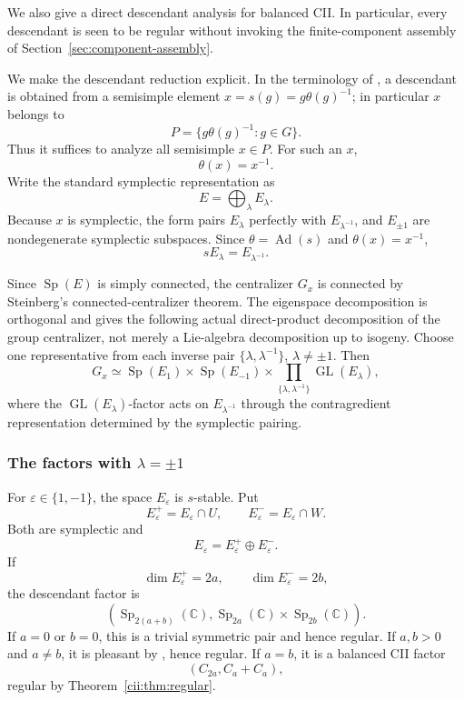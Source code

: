 \documentclass[11pt,reqno]{amsart}
\numberwithin{equation}{section}
\theoremstyle{definition}
\theoremstyle{remark}
\newcommand{\C}{\mathbb C}
\newcommand{\GL}{\operatorname{GL}}
\newcommand{\Sp}{\operatorname{Sp}}
\newcommand{\Ad}{\operatorname{Ad}}
\begin{document}
We also give a direct descendant analysis for balanced CII.  In particular,
every descendant is seen to be regular without invoking the finite-component
assembly of Section~\ref{sec:component-assembly}.

We make the descendant reduction explicit.  In the terminology of
\cite[Definition~7.2.2]{AG09}, a descendant is obtained from a semisimple
element \(x=s(g)=g\theta(g)^{-1}\); in particular \(x\) belongs to
\[
  P=\{g\theta(g)^{-1}:g\in G\}.
\]
Thus it suffices to analyze all semisimple \(x\in P\).  For such an
\(x\),
\[
\theta(x)=x^{-1}.
\]
Write the standard symplectic representation as
\[
E=\bigoplus_\lambda E_\lambda.
\]
Because \(x\) is symplectic, the form pairs
\(E_\lambda\) perfectly with \(E_{\lambda^{-1}}\), and
\(E_{\pm1}\) are nondegenerate symplectic subspaces.  Since
\(\theta=\Ad(s)\) and \(\theta(x)=x^{-1}\),
\[
sE_\lambda=E_{\lambda^{-1}}.
\]

Since $\Sp(E)$ is simply connected, the centralizer $G_x$ is connected by
Steinberg's connected-centralizer theorem.  The eigenspace decomposition is
orthogonal and gives the following actual direct-product decomposition of the
group centralizer, not merely a Lie-algebra decomposition up to isogeny.
Choose one representative from each inverse pair
\(\{\lambda,\lambda^{-1}\}\), \(\lambda\neq\pm1\).  Then
\[
G_x
\simeq
\Sp(E_1)\times\Sp(E_{-1})
\times
\prod_{\{\lambda,\lambda^{-1}\}}
\GL(E_\lambda),
\]
where the \(\GL(E_\lambda)\)-factor acts on
\(E_{\lambda^{-1}}\) through the contragredient representation determined
by the symplectic pairing.

\subsubsection{The factors with \texorpdfstring{\(\lambda=\pm1\)}{lambda = +/-1}}

For \(\varepsilon\in\{1,-1\}\), the space \(E_\varepsilon\) is
\(s\)-stable.  Put
\[
E_\varepsilon^+=E_\varepsilon\cap U,\qquad
E_\varepsilon^-=E_\varepsilon\cap W.
\]
Both are symplectic and
\[
E_\varepsilon=E_\varepsilon^+\oplus E_\varepsilon^-.
\]
If
\[
\dim E_\varepsilon^+=2a,\qquad
\dim E_\varepsilon^-=2b,
\]
the descendant factor is
\[
\left(
\Sp_{2(a+b)}(\C),
\Sp_{2a}(\C)\times\Sp_{2b}(\C)
\right).
\]
If \(a=0\) or \(b=0\), this is a trivial symmetric pair and hence regular.
If \(a,b>0\) and \(a\neq b\), it is pleasant by
\cite[Proposition~4.16]{Rubio}, hence regular.  If \(a=b\), it is a
balanced CII factor
\[
(C_{2a},C_a+C_a),
\]
regular by Theorem~\ref{cii:thm:regular}.
\end{document}
